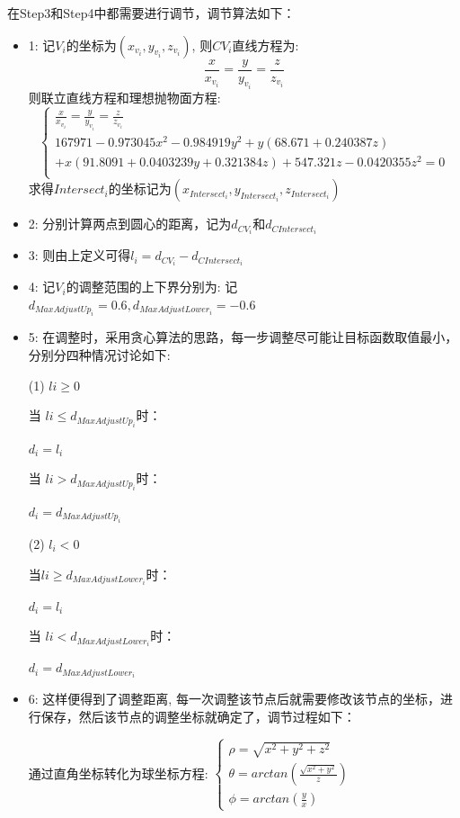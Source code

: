 \documentclass[withoutpreface,bwprint]{cumcmthesis} %
\begin{document}
在Step3和Step4中都需要进行调节，调节算法如下：
\begin{itemize}
    \item 1:
    记$V_i$的坐标为$(x_{v_i},y_{v_i},z_{v_i})$, 则$CV_i$直线方程为:
    $$\frac{x}{x_{v_i}} = \frac{y}{y_{v_i}}=\frac{z}{z_{v_i}}$$
    则联立直线方程和理想抛物面方程:
    $$\begin{cases}
        \frac{x}{x_{v_i}} = \frac{y}{y_{v_i}}=\frac{z}{z_{v_i}}\\
        167971 - 0.973045 x^2 - 0.984919 y^2 + y (68.671 + 0.240387 z) \\
        + x (91.8091 + 0.0403239 y + 0.321384 z) + 547.321 z - 0.0420355 z^2=0\\
    \end{cases}$$
    求得$Intersect_i$的坐标记为$(x_{Intersect_i},y_{Intersect_i},z_{Intersect_i})$
    
   \item 2: 分别计算两点到圆心的距离，记为$d_{CV_i}$和$d_{CIntersect_i}$
    
   \item 3: 则由上定义可得$l_i=d_{CV_i}-d_{CIntersect_i}$

   \item 4: 记$V_i$的调整范围的上下界分别为:
   记$d_{MaxAdjustUp_i} = 0.6,d_{MaxAdjustLower_i} =  -0.6 $\
   \item 5: 
   在调整时，采用贪心算法的思路，每一步调整尽可能让目标函数取值最小，分别分四种情况讨论如下:

   (1) $li\geq 0$
   
   
   当 $li\leq d_{MaxAdjustUp_i} $时：
   
   $d_i=l_i$
   
   当 $li > d_{MaxAdjustUp_i} $时：
   
   $d_i=d_{MaxAdjustUp_i}$
   
   
   
   (2) $ l_i< 0$
   
   当$li\geq d_{MaxAdjustLower_i} $时：
   
   $d_i=l_i$
   
   当 $li < d_{MaxAdjustLower_i}$时：
   
   $d_i=d_{MaxAdjustLower_i}$
   
   \item 6: 这样便得到了调整距离,
   每一次调整该节点后就需要修改该节点的坐标，进行保存，然后该节点的调整坐标就确定了，调节过程如下：

 通过直角坐标转化为球坐标方程: $\begin{cases}\rho = \sqrt{x^2+y^2+z^2} \\ \theta = arctan(\frac{\sqrt{x^2+y^2}}{z})\\ \phi = arctan(\frac{y}{x}) \end{cases}$


\end{itemize}
\end{document}
